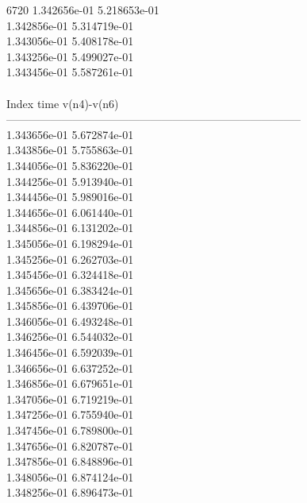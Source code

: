 6720	1.342656e-01	5.218653e-01	\\ 	1.342856e-01	5.314719e-01	\\ 	1.343056e-01	5.408178e-01	\\ 	1.343256e-01	5.499027e-01	\\ 	1.343456e-01	5.587261e-01	\\ \hline
\\ \hline
Index   time            v(n4)-v(n6)     \\ \hline
--------------------------------------------------------------------------------\\ 	1.343656e-01	5.672874e-01	\\ 	1.343856e-01	5.755863e-01	\\ 	1.344056e-01	5.836220e-01	\\ 	1.344256e-01	5.913940e-01	\\ 	1.344456e-01	5.989016e-01	\\ 	1.344656e-01	6.061440e-01	\\ 	1.344856e-01	6.131202e-01	\\ 	1.345056e-01	6.198294e-01	\\ 	1.345256e-01	6.262703e-01	\\ 	1.345456e-01	6.324418e-01	\\ 	1.345656e-01	6.383424e-01	\\ 	1.345856e-01	6.439706e-01	\\ 	1.346056e-01	6.493248e-01	\\ 	1.346256e-01	6.544032e-01	\\ 	1.346456e-01	6.592039e-01	\\ 	1.346656e-01	6.637252e-01	\\ 	1.346856e-01	6.679651e-01	\\ 	1.347056e-01	6.719219e-01	\\ 	1.347256e-01	6.755940e-01	\\ 	1.347456e-01	6.789800e-01	\\ 	1.347656e-01	6.820787e-01	\\ 	1.347856e-01	6.848896e-01	\\ 	1.348056e-01	6.874124e-01	\\ 	1.348256e-01	6.896473e-01	\\ \hline
